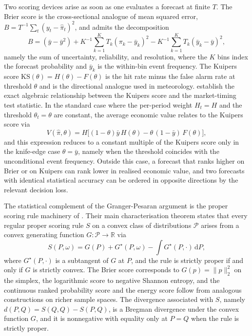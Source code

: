 Two scoring devices arise as soon as one evaluates a forecast at finite $T$.
The Brier score \citep{Brier1950} is the cross-sectional analogue of mean
squared error, $B = T^{-1} \sum_t (y_t - \hat\pi_t)^2$, and admits the
\citet{Murphy1973} decomposition
\begin{equation}
B = (\bar y - \bar y^2)
  + K^{-1} \sum_{k=1}^K T_k (\pi_k - \bar y_k)^2
  - K^{-1} \sum_{k=1}^K T_k (\bar y_k - \bar y)^2,
\label{eq:brier_decomp}
\end{equation}
namely the sum of uncertainty, reliability, and resolution, where the
$K$ bins index the forecast probability and $\bar y_k$ is the within-bin
event frequency. The Kuipers score
$\mathrm{KS}(\theta) = H(\theta) - F(\theta)$ is the hit rate minus the false
alarm rate at threshold $\theta$ and is the directional analogue used in
meteorology. \citet{GrangerPesaran2000} establish the exact algebraic
relationship between the Kuipers score and the
\citet{PesaranTimmermann1992} market-timing test statistic. In the standard
case where the per-period weight $H_t = H$ and the threshold $\theta_t = \theta$
are constant, the average economic value relates to the Kuipers score via
\begin{equation}
V(\hat\pi, \theta) = H \bigl[ (1 - \theta) \bar y\, H(\theta)
  - \theta\, (1 - \bar y)\, F(\theta) \bigr],
\label{eq:gp_ks_link}
\end{equation}
and this expression reduces to a constant multiple of the Kuipers score only
in the knife-edge case $\theta = \bar y$, namely when the threshold coincides
with the unconditional event frequency. Outside this case, a forecast that
ranks higher on Brier or on Kuipers can rank lower in realised economic value,
and two forecasts with identical statistical accuracy can be ordered in
opposite directions by the relevant decision loss.

The statistical complement of the Granger-Pesaran argument is the proper
scoring rule machinery of \citet{GneitingRaftery2007}. Their main
characterisation theorem states that every regular proper scoring rule $S$ on
a convex class of distributions $\mathcal P$ arises from a convex generating
function $G : \mathcal P \to \mathbb R$ via
\begin{equation}
S(P, \omega) = G(P) + G^\star(P, \omega) - \int G^\star(P, \cdot) \,\mathrm dP,
\label{eq:proper_score_rep}
\end{equation}
where $G^\star(P, \cdot)$ is a subtangent of $G$ at $P$, and the rule is
strictly proper if and only if $G$ is strictly convex. The Brier score
corresponds to $G(p) = \|p\|_2^2$ on the simplex, the logarithmic score to
negative Shannon entropy, and the continuous ranked probability score and the
energy score follow from analogous constructions on richer sample spaces. The
divergence associated with $S$, namely
$d(P, Q) = S(Q, Q) - S(P, Q)$, is a Bregman divergence under the convex
function $G$, and it is nonnegative with equality only at $P = Q$ when the rule
is strictly proper.

